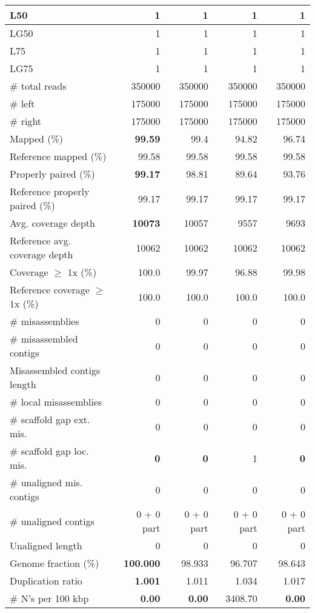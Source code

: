 \documentclass[12pt,a4paper]{article}
\begin{document}
\begin{table}[ht]
\begin{center}
\begin{tabular}{|l*{4}{|r}|}
L50 & 1 & 1 & 1 & 1 \\ \hline
LG50 & 1 & 1 & 1 & 1 \\ \hline
L75 & 1 & 1 & 1 & 1 \\ \hline
LG75 & 1 & 1 & 1 & 1 \\ \hline
\# total reads & 350000 & 350000 & 350000 & 350000 \\ \hline
\# left & 175000 & 175000 & 175000 & 175000 \\ \hline
\# right & 175000 & 175000 & 175000 & 175000 \\ \hline
Mapped (\%) & {\bf 99.59} & 99.4 & 94.82 & 96.74 \\ \hline
Reference mapped (\%) & 99.58 & 99.58 & 99.58 & 99.58 \\ \hline
Properly paired (\%) & {\bf 99.17} & 98.81 & 89.64 & 93.76 \\ \hline
Reference properly paired (\%) & 99.17 & 99.17 & 99.17 & 99.17 \\ \hline
Avg. coverage depth & {\bf 10073} & 10057 & 9557 & 9693 \\ \hline
Reference avg. coverage depth & 10062 & 10062 & 10062 & 10062 \\ \hline
Coverage $\geq$ 1x (\%) & 100.0 & 99.97 & 96.88 & 99.98 \\ \hline
Reference coverage $\geq$ 1x (\%) & 100.0 & 100.0 & 100.0 & 100.0 \\ \hline
\# misassemblies & 0 & 0 & 0 & 0 \\ \hline
\# misassembled contigs & 0 & 0 & 0 & 0 \\ \hline
Misassembled contigs length & 0 & 0 & 0 & 0 \\ \hline
\# local misassemblies & 0 & 0 & 0 & 0 \\ \hline
\# scaffold gap ext. mis. & 0 & 0 & 0 & 0 \\ \hline
\# scaffold gap loc. mis. & {\bf 0} & {\bf 0} & 1 & {\bf 0} \\ \hline
\# unaligned mis. contigs & 0 & 0 & 0 & 0 \\ \hline
\# unaligned contigs & 0 + 0 part & 0 + 0 part & 0 + 0 part & 0 + 0 part \\ \hline
Unaligned length & 0 & 0 & 0 & 0 \\ \hline
Genome fraction (\%) & {\bf 100.000} & 98.933 & 96.707 & 98.643 \\ \hline
Duplication ratio & {\bf 1.001} & 1.011 & 1.034 & 1.017 \\ \hline
\# N's per 100 kbp & {\bf 0.00} & {\bf 0.00} & 3408.70 & {\bf 0.00} \\ \hline

\end{tabular}
\end{center}
\end{table}
\end{document}
